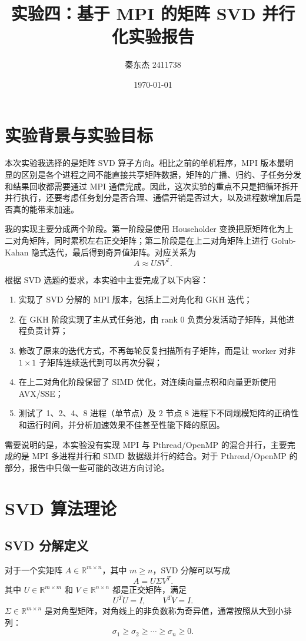 \documentclass[UTF8,a4paper,12pt]{ctexart}
\title{实验四：基于 MPI 的矩阵 SVD 并行化实验报告}
\author{秦东杰 2411738}
\date{\today}
\begin{document}
\maketitle

\section{实验背景与实验目标}

本次实验我选择的是矩阵 SVD 算子方向。相比之前的单机程序，MPI 版本最明显的区别是各个进程之间不能直接共享矩阵数据，矩阵的广播、归约、子任务分发和结果回收都需要通过 MPI 通信完成。因此，这次实验的重点不只是把循环拆开并行执行，还要考虑任务划分是否合理、通信开销是否过大，以及进程数增加后是否真的能带来加速。

我的实现主要分成两个阶段。第一阶段是使用 Householder 变换把原矩阵化为上二对角矩阵，同时累积左右正交矩阵；第二阶段是在上二对角矩阵上进行 Golub-Kahan 隐式迭代，最后得到奇异值矩阵。对应关系为
\[
A \approx U S V^T.
\]

根据 SVD 选题的要求，本实验中主要完成了以下内容：
\begin{enumerate}
  \item 实现了 SVD 分解的 MPI 版本，包括上二对角化和 GKH 迭代；
  \item 在 GKH 阶段实现了主从式任务池，由 rank 0 负责分发活动子矩阵，其他进程负责计算；
  \item 修改了原来的迭代方式，不再每轮反复扫描所有子矩阵，而是让 worker 对非 $1\times1$ 子矩阵连续迭代到可以再次分裂；
  \item 在上二对角化阶段保留了 SIMD 优化，对连续向量点积和向量更新使用 AVX/SSE；
  \item 测试了 1、2、4、8 进程（单节点）及 2 节点 8 进程下不同规模矩阵的正确性和运行时间，并分析加速效果不佳甚至性能下降的原因。
\end{enumerate}

需要说明的是，本实验没有实现 MPI 与 Pthread/OpenMP 的混合并行，主要完成的是 MPI 多进程并行和 SIMD 数据级并行的结合。对于 Pthread/OpenMP 的部分，报告中只做一些可能的改进方向讨论。

\section{SVD 算法理论}

\subsection{SVD 分解定义}

对于一个实矩阵 $A\in \mathbb{R}^{m\times n}$，其中 $m\ge n$，SVD 分解可以写成
\[
A = U\Sigma V^T.
\]
其中 $U\in\mathbb{R}^{m\times m}$ 和 $V\in\mathbb{R}^{n\times n}$ 都是正交矩阵，满足
\[
U^TU=I,\qquad V^TV=I.
\]
$\Sigma\in\mathbb{R}^{m\times n}$ 是对角型矩阵，对角线上的非负数称为奇异值，通常按照从大到小排列：
\[
\sigma_1\ge \sigma_2\ge \cdots \ge \sigma_n\ge 0.
\]
\end{document}
